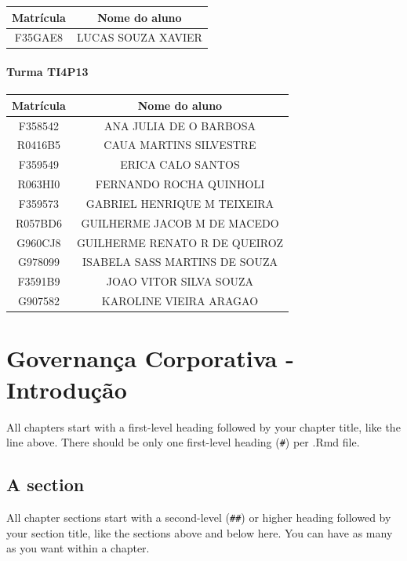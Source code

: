 \documentclass[
]{book}
\begin{document}
\begin{longtable}[]{@{}cc@{}}
\toprule\noalign{}
Matrícula & Nome do aluno \\
\midrule\noalign{}
\endhead
\bottomrule\noalign{}
\endlastfoot
F35GAE8 & LUCAS SOUZA XAVIER \\
\end{longtable}

\subsubsection{Turma TI4P13}\label{turma-ti4p13}

\begin{longtable}[]{@{}cc@{}}
\toprule\noalign{}
Matrícula & Nome do aluno \\
\midrule\noalign{}
\endhead
\bottomrule\noalign{}
\endlastfoot
F358542 & ANA JULIA DE O BARBOSA \\
R0416B5 & CAUA MARTINS SILVESTRE \\
F359549 & ERICA CALO SANTOS \\
R063HI0 & FERNANDO ROCHA QUINHOLI \\
F359573 & GABRIEL HENRIQUE M TEIXEIRA \\
R057BD6 & GUILHERME JACOB M DE MACEDO \\
G960CJ8 & GUILHERME RENATO R DE QUEIROZ \\
G978099 & ISABELA SASS MARTINS DE SOUZA \\
F3591B9 & JOAO VITOR SILVA SOUZA \\
G907582 & KAROLINE VIEIRA ARAGAO \\
\end{longtable}

\chapter{Governança Corporativa - Introdução}\label{governanuxe7a-corporativa---introduuxe7uxe3o}

All chapters start with a first-level heading followed by your chapter title, like the line above. There should be only one first-level heading (\texttt{\#}) per .Rmd file.

\section{A section}\label{a-section}

All chapter sections start with a second-level (\texttt{\#\#}) or higher heading followed by your section title, like the sections above and below here. You can have as many as you want within a chapter.
\end{document}
